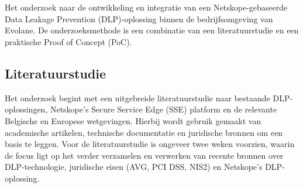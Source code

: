
\chapter{}%
\label{ch:methodologie}


Het onderzoek naar de ontwikkeling en integratie van een Netskope-gebaseerde Data Leakage Prevention (DLP)-oplossing binnen 
de bedrijfsomgeving van Evolane. De onderzoeksmethode is een combinatie van een literatuurstudie en een praktische Proof of Concept (PoC).

\section{Literatuurstudie}%

Het onderzoek begint met een uitgebreide literatuurstudie naar bestaande DLP-oplossingen, Netskope's Secure Service Edge (SSE) platform en de relevante Belgische en Europese wetgevingen. 
Hierbij wordt gebruik gemaakt van academische artikelen, technische documentatie en juridische bronnen om een basis te leggen. 
Voor de literatuurstudie is ongeveer twee weken voorzien, waarin de focus ligt op het verder verzamelen en verwerken van recente bronnen
over DLP-technologie, juridische eisen (AVG, PCI DSS, NIS2) en Netskope's DLP-oplossing.

